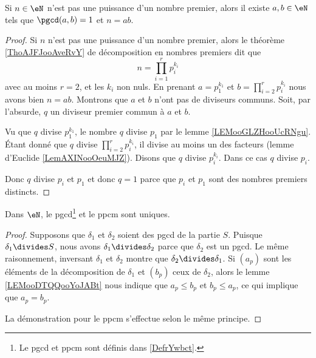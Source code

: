 \begin{corollary}		\label{CORooWBSQooQOEmaC}
	Si \( n\in \eN\) n'est pas une puissance d'un nombre premier, alors il existe \( a,b\in \eN\) tels que \( \pgcd(a,b)=1\) et \( n=ab\).
\end{corollary}

\begin{proof}
	Si \( n\) n'est pas une puissance d'un nombre premier, alors le théorème \ref{ThoAJFJooAveRvY} de décomposition en nombres premiers dit que
	\begin{equation}
		n=\prod_{i=1}^rp_i^{k_i}
	\end{equation}
	avec au moins \( r=2\), et les \( k_i\) non nuls. En prenant \( a=p_1^{k_1}\) et \( b=\prod_{i=2}^rp_i^{k_i}\) nous avons bien \( n=ab\). Montrons que \( a\) et \( b\) n'ont pas de diviseurs communs. Soit, par l'absurde, \( q\) un diviseur premier commun à \( a\) et \( b\).

	Vu que \( q\) divise \( p_1^{k_1}\), le nombre \( q\) divise \( p_1\) par le lemme \ref{LEMooGLZHooUcRNgu}. Étant donné que \( q\) divise \( \prod_{i=2}^rp_i^{k_i}\), il divise au moins un des facteurs (lemme d'Euclide \ref{LemAXINooOeuMJZ}). Disons que \( q\) divise \( p_i^{k_i}\). Dans ce cas \( q\) divise \( p_i\).

	Donc \( q\) divise \( p_i\) et \( p_1\) et donc \( q=1\) parce que \( p_i\) et \( p_1\) sont des nombres premiers distincts.
\end{proof}

\begin{lemma}       \label{LEMooBJVJooFyuFeN}
	Dans \( \eN\), le pgcd\footnote{Le pgcd et ppcm sont définis dans \ref{DefrYwbct}.} et le ppcm sont uniques.
\end{lemma}

\begin{proof}
	Supposons que \( \delta_1\) et \( \delta_2\) soient des pgcd de la partie \( S\). Puisque \( \delta_1\divides S\), nous avons \( \delta_1\divides \delta_2\) parce que \( \delta_2\) est un pgcd. Le même raisonnement, inversant \( \delta_1\) et \( \delta_2\) montre que \( \delta_2\divides \delta_1\). Si \( (a_p)\) sont les éléments de la décomposition de \( \delta_1\) et \( (b_p)\) ceux de \( \delta_2\), alors le lemme \ref{LEMooDTQQooYoJABt} nous indique que \( a_p\leq b_p\) et \( b_p\leq a_p\), ce qui implique que \( a_p=b_p\).

	La démonstration pour le ppcm s'effectue selon le même principe.
\end{proof}

